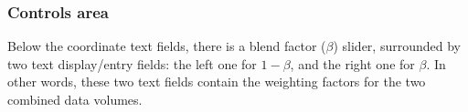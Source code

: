 \subsubsection{Controls area}
Below the coordinate text fields, there is a blend factor ($\beta$)
slider, surrounded by two text display/entry fields: the left one for
$1 - \beta$, and the right one for $\beta$.  In other words, these two
text fields contain the weighting factors for the two combined data
volumes.


